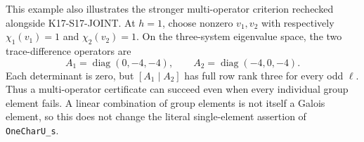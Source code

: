 This example also illustrates the stronger multi-operator
criterion rechecked alongside K17-S17-JOINT. At $h=1$, choose nonzero
$v_1,v_2$ with respectively $\chi_1(v_1)=1$ and
$\chi_2(v_2)=1$. On the three-system eigenvalue space,
the two trace-difference operators are
\[
 A_1=\operatorname{diag}(0,-4,-4),\qquad
 A_2=\operatorname{diag}(-4,0,-4).
                                                               \tag{TA.6}
\]
Each determinant is zero, but $[A_1\mid A_2]$ has full
row rank three for every odd $\ell$. Thus a multi-operator
certificate can succeed even when every individual group
element fails. A linear combination of group elements is
not itself a Galois element, so this does not change the
literal single-element assertion of \texttt{OneCharU\_s}.

